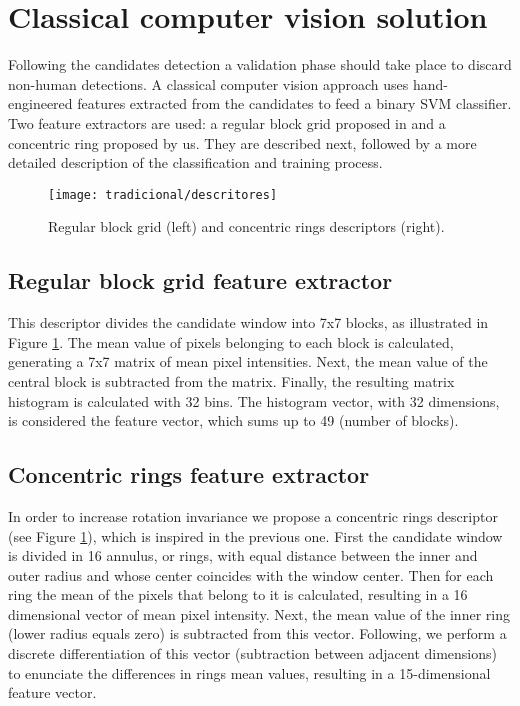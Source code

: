 \section{Classical computer vision solution}
\label{sec:classical}

    Following the candidates detection a validation phase should take place to discard non-human detections. A classical computer vision approach \cite{rauter} uses hand-engineered features extracted from the candidates to feed a binary SVM classifier. Two feature extractors are used: a regular block grid proposed in \cite{rauter} and a concentric ring proposed by us. They are described next, followed by a more detailed description of the classification and training process.

    \begin{figure}
    \centering
    \texttt{[image: tradicional/descritores]}
    \caption{Regular block grid (left) and concentric rings descriptors (right).}
    \label{fig:descriptors}
    \end{figure}

    \subsection{Regular block grid feature extractor}
      This descriptor divides the candidate window into 7x7 blocks, as illustrated in Figure \ref{fig:descriptors}. The mean value of pixels belonging to each block is calculated, generating a 7x7 matrix of mean pixel intensities. Next, the mean value of the central block is subtracted from the matrix. Finally, the resulting matrix histogram is calculated with 32 bins. The histogram vector, with 32 dimensions, is considered the feature vector, which sums up to 49 (number of blocks).

    \subsection{Concentric rings feature extractor}
      In order to increase rotation invariance we propose a concentric rings descriptor (see Figure \ref{fig:descriptors}), which is inspired in the previous one. First the candidate window is divided in 16 annulus, or rings, with equal distance between the inner and outer radius and whose center coincides with the window center. Then for each ring the mean of the pixels that belong to it is calculated, resulting in a 16 dimensional vector of mean pixel intensity. Next, the mean value of the inner ring (lower radius equals zero) is subtracted from this vector. Following, we perform a discrete differentiation of this vector (subtraction between adjacent dimensions) to enunciate the differences in rings mean values, resulting in a 15-dimensional feature vector.

